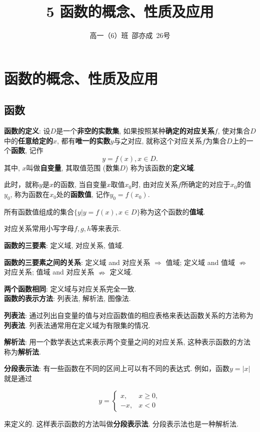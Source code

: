 \documentclass[8pt]{article}
\title{5 函数的概念、性质及应用}
\author{高一（6）班\ 邵亦成\ 26号}
\begin{document}
	\maketitle

	\section{函数的概念、性质及应用}
		\subsection{函数}
			\textbf{函数的定义}: 设$D$是一个\textbf{非空的实数集}, 如果按照某种\textbf{确定的对应关系$f$}, 使对集合$D$中的\textbf{任意给定的$x$}, 都有\textbf{唯一的实数$y$}与之对应, 就称这个对应关系$f$为集合$D$上的一个\textbf{函数}, 记作$$y=f(x), x \in D.$$ 其中, $x$叫做\textbf{自变量}, 其取值范围 (数集$D$) 称为该函数的\textbf{定义域}. 

			此时，就称$y$是$x$的函数, 当自变量$x$取值$x_0$时, 由对应关系$f$所确定的对应于$x_0$的值$y_0$, 称为函数在$x_0$处的\textbf{函数值}, 记作$y_0=f(x_0)$.

			所有函数值组成的集合$\{y|y=f(x), x\in D\}$称为这个函数的\textbf{值域}.

			对应关系常用小写字母$f, g, h$等来表示.

			\textbf{函数的三要素}: 定义域, 对应关系, 值域.

			\textbf{函数的三要素之间的关系}: 定义域 and 对应关系 $\Rightarrow$ 值域; 定义域 and 值域 $\nRightarrow$ 对应关系; 值域 and 对应关系 $\nRightarrow$ 定义域.

			\textbf{两个函数相同}: 定义域与对应关系完全一致.
			~\\

			\textbf{函数的表示方法}: 列表法, 解析法, 图像法.

			\textbf{列表法}: 通过列出自变量的值与对应函数值的相应表格来表达函数关系的方法称为\textbf{列表法}. 列表法通常用在定义域为有限集的情况.

			\textbf{解析法}: 用一个数学表达式来表示两个变量之间的对应关系, 这种表示函数的方法称为\textbf{解析法}.

			\textbf{分段表示法}: 有一些函数在不同的区间上可以有不同的表达式. 例如，函数$y=|x|$就是通过

			$$
			y=
			\left\{
			\begin{array}{rl}
			x,&x\geq 0,\\
			-x,&x<0
			\end{array}
			\right.
			$$

			来定义的. 这样表示函数的方法叫做\textbf{分段表示法}. 分段表示法也是一种解析法.
\end{document}

